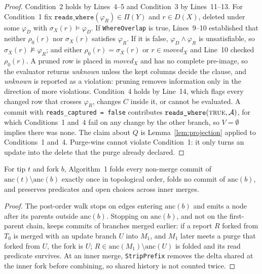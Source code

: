 \documentclass[sigconf, nonacm]{acmart}
\begin{document}
\begin{proof}
Condition~2 holds by Lines~4--5 and Condition~3 by Lines~11--13. For Condition~1 fix $\texttt{reads\_where}(\varphi_R) \in \Pi(Y)$ and $r \in D(X)$, deleted under some $\varphi_D$ with $\sigma_X(r) \models \varphi_D$. If \texttt{WhereOverlap} is true, Lines~9--10 established that neither $\rho_0(r)$ nor $\sigma_X(r)$ satisfies $\varphi_R$. If it is false, $\varphi_D \land \varphi_R$ is unsatisfiable, so $\sigma_X(r) \not\models \varphi_R$; and either $\rho_0(r) = \sigma_X(r)$ or $r \in \mathit{moved}_X$ and Line~10 checked $\rho_0(r)$. A pruned row is placed in $\mathit{moved}_X$ and has no complete pre-image, so the evaluator returns \emph{unknown} unless the kept columns decide the clause, and \emph{unknown} is reported as a violation: pruning removes information only in the direction of more violations. Condition~4 holds by Line~14, which flags every changed row that crosses $\varphi_R$, changes $C$ inside it, or cannot be evaluated. A commit with \texttt{reads\_captured = false} contributes $\texttt{reads\_where}(\textsc{true}, \mathcal{A})$, for which Conditions~1 and~4 fail on any change by the other branch, so $V = \emptyset$ implies there was none. The claim about $Q$ is Lemma~\ref{lem:projection} applied to Conditions~1 and~4. Purge-wins cannot violate Condition~1: it only turns an update into the delete that the purge already declared.
\end{proof}

\begin{lemma}
\label{lem:replay}
For tip $t$ and fork $b$, Algorithm~1 folds every non-merge commit of $\text{anc}(t) \setminus \text{anc}(b)$ exactly once in topological order, folds no commit of $\text{anc}(b)$, and preserves predicates and open choices across inner merges.
\end{lemma}

\begin{proof}
The post-order walk stops on edges entering $\text{anc}(b)$ and emits a node after its parents outside $\text{anc}(b)$. Stopping on $\text{anc}(b)$, and not on the first-parent chain, keeps commits of branches merged earlier: if a report $R$ forked from $T_0$ is merged with an update branch $U$ into $M_1$, and $M_1$ later meets a purge that forked from $U$, the fork is $U$; $R \in \text{anc}(M_1) \setminus \text{anc}(U)$ is folded and its read predicate survives. At an inner merge, \texttt{StripPrefix} removes the delta shared at the inner fork before combining, so shared history is not counted twice.
\end{proof}
\end{document}
